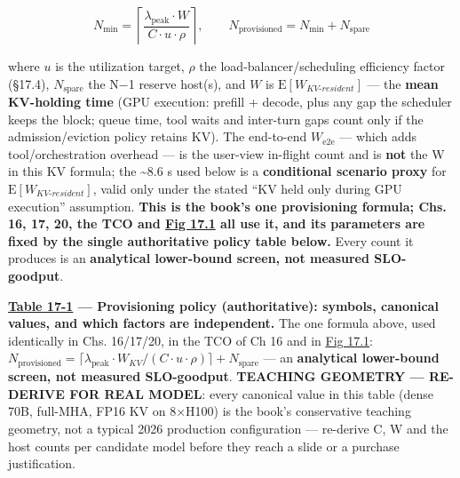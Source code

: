 \[
N_\text{min} = \left\lceil \frac{\lambda_\text{peak} \cdot W}{C \cdot u \cdot \rho} \right\rceil, \qquad N_\text{provisioned} = N_\text{min} + N_\text{spare}
\]

where \(u\) is the utilization target, \(\rho\) the
load‑balancer/scheduling efficiency factor (§17.4), \(N_\text{spare}\)
the N−1 reserve host(s), and \(W\) is
\(\mathrm{E}[W_{KV\text{-}resident}]\) --- the \textbf{mean KV-holding
time} (GPU execution: prefill + decode, plus any gap the scheduler keeps
the block; queue time, tool waits and inter-turn gaps count only if the
admission/eviction policy retains KV). The end-to-end
\(W_{\mathrm{e2e}}\) --- which adds tool/orchestration overhead --- is
the user-view in-flight count and is \textbf{not} the W in this KV
formula; the \textasciitilde8.6 s used below is a \textbf{conditional
scenario proxy} for \(\mathrm{E}[W_{KV\text{-}resident}]\), valid only
under the stated ``KV held only during GPU execution'' assumption.
\textbf{This is the book's one provisioning formula; Chs. 16, 17, 20,
the TCO and \hyperref[fig:17.1]{Fig 17.1} all use it, and its parameters are fixed by the
single authoritative policy table below.} Every count it produces is an
\textbf{analytical lower-bound screen, not measured SLO-goodput}.

\textbf{\hyperref[tab:17.1]{Table 17-1} --- Provisioning policy (authoritative): symbols,
canonical values, and which factors are independent.} The one formula
above, used identically in Chs. 16/17/20, in the TCO of Ch 16 and in \hyperref[fig:17.1]{Fig 17.1}:
\(N_\text{provisioned} = \lceil \lambda_\text{peak} \cdot W_{KV} / (C \cdot u \cdot \rho) \rceil + N_\text{spare}\)
--- an \textbf{analytical lower-bound screen, not measured SLO-goodput}.
\textbf{TEACHING GEOMETRY --- RE-DERIVE FOR REAL MODEL}: every canonical
value in this table (dense 70B, full-MHA, FP16 KV on 8×H100) is the
book's conservative teaching geometry, not a typical 2026 production
configuration --- re-derive C, W and the host counts per candidate model
before they reach a slide or a purchase justification.

